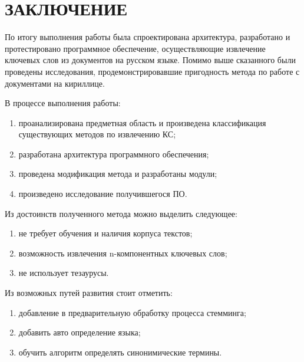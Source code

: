 \chapter*{ЗАКЛЮЧЕНИЕ}
По итогу выполнения работы была спроектирована архитектура, разработано и протестировано программное обеспечение, осуществляющие извлечение ключевых слов из документов на русском языке.
Помимо выше сказанного были проведены исследования, продемонстрировавшие пригодность метода по работе с документами на кириллице.

В процессе выполнения работы:
\begin{enumerate}
	\item проанализирована предметная область и произведена классификация существующих методов по извлечению КС;
	\item разработана архитектура программного обеспечения;
	\item проведена модификация метода и разработаны модули;
	\item произведено исследование получившегося ПО.
\end{enumerate}

Из достоинств полученного метода можно выделить следующее:
\begin{enumerate}
	\item не требует обучения и наличия корпуса текстов;
	\item возможность извлечения n-компонентных ключевых слов;
	\item не использует тезаурусы. 
\end{enumerate}

Из возможных путей развития стоит отметить:
\begin{enumerate}
	\item добавление в предварительную обработку процесса стемминга;
	\item добавить авто определение языка;
	\item обучить алгоритм определять синонимические термины.
\end{enumerate}